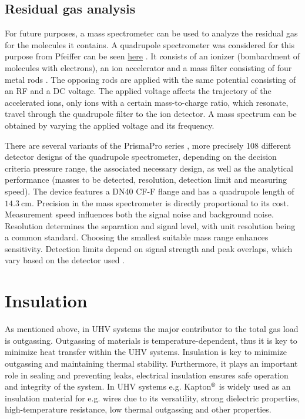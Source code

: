 \subsection{Residual gas analysis}

For future purposes, a mass spectrometer can be used to analyze the residual gas for the molecules it contains.
A quadrupole spectrometer was considered for this purpose from Pfeiffer can be seen \href{https://www.pfeiffer-vacuum.com/global/de/shop/products/6d0f7cd8-a157-453a-802a-48eac86b4c85}{here} \cite{pfeiffer}.
It consists of an ionizer (bombardment of molecules with electrons), an ion accelerator and a mass filter consisting of four metal rods \cite{quardrupolmassspec}.
The opposing rods are applied with the same potential consisting of an RF and a DC voltage.
The applied voltage affects the trajectory of the accelerated ions, only ions with a certain mass-to-charge ratio, which resonate, travel through the quadrupole filter to the ion detector.
A mass spectrum can be obtained by varying the applied voltage and its frequency.


There are several variants of the PrismaPro series \cite{pfeiffer}, more precisely 108 different detector designs of the quadrupole spectrometer, depending on the decision criteria pressure range, the associated necessary design, as well as the analytical performance (masses to be detected, resolution, detection limit and measuring speed).
The device features a DN40 CF-F flange and has a quadrupole length of $\SI{14.3}{\centi\meter}$.
Precision in the mass spectrometer is directly proportional to its cost.
Measurement speed influences both the signal noise and background noise.
Resolution determines the separation and signal level, with unit resolution being a common standard.
Choosing the smallest suitable mass range enhances sensitivity.
Detection limits depend on signal strength and peak overlaps, which vary based on the detector used \cite{pfeiffer}.

\section{Insulation}

As mentioned above, in UHV systems the major contributor to the total gas load is outgassing.
Outgassing of materials is temperature-dependent, thus it is key to minimize heat transfer within the UHV systems.
Insulation is key to minimize outgassing and maintaining thermal stability.
Furthermore, it plays an important role in sealing and preventing leaks, electrical insulation ensures safe operation and integrity of the system.
In UHV systems e.g. Kapton$\textsuperscript{\textregistered}$ is widely used as an insulation material for e.g. wires due to its versatility, strong dielectric properties, high-temperature resistance, low thermal outgassing and other properties.


